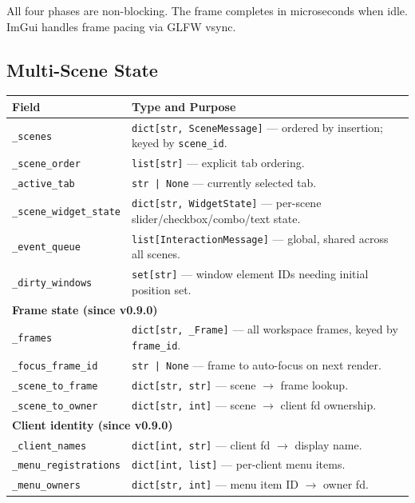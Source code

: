 \documentclass[a4paper,10pt]{article}
\newcommand{\field}[1]{\texttt{#1}}
\begin{document}
All four phases are non-blocking.  The frame completes in
microseconds when idle.  ImGui handles frame pacing via GLFW vsync.

\subsection{Multi-Scene State}

\begin{center}
\begin{tabular}{lp{8cm}}
\toprule
\textbf{Field} & \textbf{Type and Purpose} \\
\midrule
\texttt{\_scenes}              & \texttt{dict[str, SceneMessage]} --- ordered
  by insertion; keyed by \field{scene\_id}. \\
\texttt{\_scene\_order}        & \texttt{list[str]} --- explicit tab ordering. \\
\texttt{\_active\_tab}         & \texttt{str | None} --- currently selected tab. \\
\texttt{\_scene\_widget\_state} & \texttt{dict[str, WidgetState]} --- per-scene
  slider/checkbox/combo/text state. \\
\texttt{\_event\_queue}        & \texttt{list[InteractionMessage]} --- global,
  shared across all scenes. \\
\texttt{\_dirty\_windows}      & \texttt{set[str]} --- window element IDs
  needing initial position set. \\
\midrule
\multicolumn{2}{l}{\textbf{Frame state (since v0.9.0)}} \\
\midrule
\texttt{\_frames}             & \texttt{dict[str, \_Frame]} --- all workspace
  frames, keyed by \field{frame\_id}. \\
\texttt{\_focus\_frame\_id}   & \texttt{str | None} --- frame to auto-focus
  on next render. \\
\texttt{\_scene\_to\_frame}   & \texttt{dict[str, str]} --- scene
  $\to$ frame lookup. \\
\texttt{\_scene\_to\_owner}   & \texttt{dict[str, int]} --- scene
  $\to$ client fd ownership. \\
\midrule
\multicolumn{2}{l}{\textbf{Client identity (since v0.9.0)}} \\
\midrule
\texttt{\_client\_names}      & \texttt{dict[int, str]} --- client fd
  $\to$ display name. \\
\texttt{\_menu\_registrations} & \texttt{dict[int, list]} --- per-client
  menu items. \\
\texttt{\_menu\_owners}       & \texttt{dict[str, int]} --- menu item ID
  $\to$ owner fd. \\
\bottomrule
\end{tabular}
\end{center}
\end{document}
